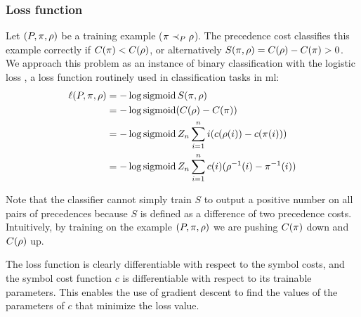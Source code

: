 \subsubsection{Loss function}

Let $(P, \pi, \rho)$ be a training example ($\pi \prec_{P} \rho$).
The precedence cost classifies this example correctly if $C(\pi) < C(\rho)$,
or alternatively $S(\pi, \rho) = C(\rho) - C(\pi) > 0$.
We approach this problem as an instance of binary classification with the logistic loss \cite{Mohri2018},
a loss function routinely used in classification tasks in \acrlong{ml}:
\begin{align*}
\ell(P, \pi, \rho)
&= - \log \operatorname{sigmoid} S(\pi, \rho) \\
&= - \log \operatorname{sigmoid} (C(\rho) - C(\pi)) \\
&= - \log \operatorname{sigmoid} Z_n \sum_{i=1}^n i (c(\rho(i)) - c(\pi(i))) \\
&= - \log \operatorname{sigmoid} Z_n \sum_{i=1}^n c(i) (\rho^{-1}(i) - \pi^{-1}(i))
\end{align*}

Note that the classifier cannot simply train $S$ to output a positive number on all pairs of precedences
because $S$ is defined as a difference of two precedence costs.
Intuitively, by training on the example $(P, \pi, \rho)$
we are pushing $C(\pi)$ down and $C(\rho)$ up.

The loss function is clearly differentiable with respect to the symbol costs,
and the symbol cost function $c$ is differentiable with respect to its trainable parameters.
This enables the use of gradient descent to find the values of the parameters of $c$
that minimize the loss value.
